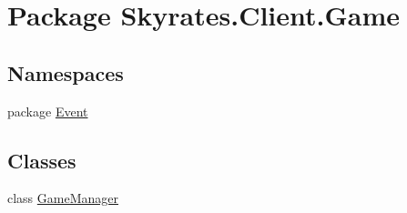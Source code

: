 \hypertarget{namespace_skyrates_1_1_client_1_1_game}{\section{Package Skyrates.\-Client.\-Game}
\label{namespace_skyrates_1_1_client_1_1_game}
}
\subsection*{Namespaces}
\begin{DoxyCompactItemize}
\item 
package \hyperlink{namespace_skyrates_1_1_client_1_1_game_1_1_event}{Event}
\end{DoxyCompactItemize}
\subsection*{Classes}
\begin{DoxyCompactItemize}
\item 
class \hyperlink{class_skyrates_1_1_client_1_1_game_1_1_game_manager}{Game\-Manager}
\end{DoxyCompactItemize}
